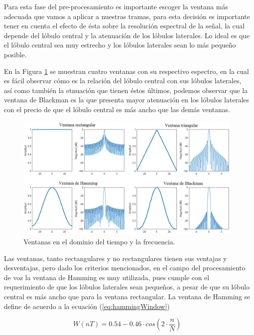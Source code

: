 Para esta fase del pre-procesamiento es importante escoger la ventana más adecuada que vamos a aplicar a nuestras tramas, para esta decisión es importante tener en cuenta el efecto de ésta sobre la resolución espectral de la señal, la cual depende del lóbulo central y la atenuación de los lóbulos laterales. Lo ideal es que el lóbulo central sea muy estrecho y los lóbulos laterales sean lo más pequeño posible.

En la Figura \ref{fig:windows} se muestran cuatro ventanas con su respectivo espectro, en la cual es fácil observar cómo es la relación del lóbulo central con sus lóbulos laterales, así como también la etnuación que tienen éstos últimos, podemos observar que la ventana de Blackman es la que presenta mayor atenuación en los lóbulos laterales con el precio de que el lóbulo central  es más ancho que las demás ventanas.

\begin{figure}[H]
	\centering
	\includegraphics[width=1\linewidth]{figures/windows}
	\caption{Ventanas en el dominio del tiempo y la frecuencia.}
	\label{fig:windows}
\end{figure}

Las ventanas, tanto rectangulares y no rectangulares tienen sus ventajas y desventajas, pero dado los criterios mencionados, en el campo del procesamiento de voz la ventana de Hamming es muy utilizada, pues cumple con el requerimiento de que los lóbulos laterales sean pequeños, a pesar de que su lóbulo central es más ancho que para la ventana rectangular. La ventana de Hamming se define de acuerdo a la ecuación (\ref{eq:hammingWindow})

\begin{equation}\label{eq:hammingWindow}
	W(nT)=0.54-0.46\cdot cos(2\cdot \frac{n}{N})
\end{equation}

